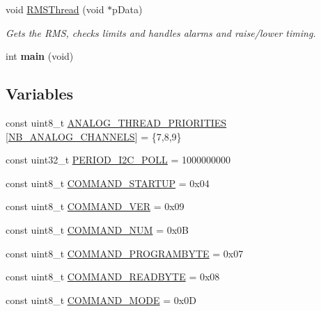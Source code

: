 \begin{DoxyCompactItemize}
void \hyperlink{group__main__module_gae075b403a6575a95c5014e980b2e6112}{R\+M\+S\+Thread} (void $\ast$p\+Data)
\begin{DoxyCompactList}\small\item\em Gets the R\+M\+S, checks limits and handles alarms and raise/lower timing. \end{DoxyCompactList}\item 
\hypertarget{group__main__module_ga840291bc02cba5474a4cb46a9b9566fe}{}int {\bfseries main} (void)\label{group__main__module_ga840291bc02cba5474a4cb46a9b9566fe}

\end{DoxyCompactItemize}
\subsection*{Variables}
\begin{DoxyCompactItemize}
\item 
const uint8\+\_\+t \hyperlink{group__main__module_ga8916636821cdde434ff4869a5d9ef1b7}{A\+N\+A\+L\+O\+G\+\_\+\+T\+H\+R\+E\+A\+D\+\_\+\+P\+R\+I\+O\+R\+I\+T\+I\+E\+S} \mbox{[}\hyperlink{group__main__module_ga300da08cc989dc0963caf3a5afc024b8}{N\+B\+\_\+\+A\+N\+A\+L\+O\+G\+\_\+\+C\+H\+A\+N\+N\+E\+L\+S}\mbox{]} = \{7,8,9\}
\item 
const uint32\+\_\+t \hyperlink{group__main__module_ga4b8052f26442dadff956fa68b94b62f2}{P\+E\+R\+I\+O\+D\+\_\+\+I2\+C\+\_\+\+P\+O\+L\+L} = 1000000000
\item 
const uint8\+\_\+t \hyperlink{group__main__module_gae92e2c71adaaae707782058cec983f91}{C\+O\+M\+M\+A\+N\+D\+\_\+\+S\+T\+A\+R\+T\+U\+P} = 0x04
\item 
const uint8\+\_\+t \hyperlink{group__main__module_gaf9fddcc7682949db939222cec848b92c}{C\+O\+M\+M\+A\+N\+D\+\_\+\+V\+E\+R} = 0x09
\item 
const uint8\+\_\+t \hyperlink{group__main__module_gab87bb2bd23dd78fbe94f98c0d4d51bfc}{C\+O\+M\+M\+A\+N\+D\+\_\+\+N\+U\+M} = 0x0\+B
\item 
const uint8\+\_\+t \hyperlink{group__main__module_gae8762c85b8519b08700226b967c9581c}{C\+O\+M\+M\+A\+N\+D\+\_\+\+P\+R\+O\+G\+R\+A\+M\+B\+Y\+T\+E} = 0x07
\item 
const uint8\+\_\+t \hyperlink{group__main__module_ga7bd303e78d4119c2d34e00967c1b1230}{C\+O\+M\+M\+A\+N\+D\+\_\+\+R\+E\+A\+D\+B\+Y\+T\+E} = 0x08
\item 
const uint8\+\_\+t \hyperlink{group__main__module_gae2909d574bfc1ab702eed1fb28a62505}{C\+O\+M\+M\+A\+N\+D\+\_\+\+M\+O\+D\+E} = 0x0\+D

\end{DoxyCompactItemize}
